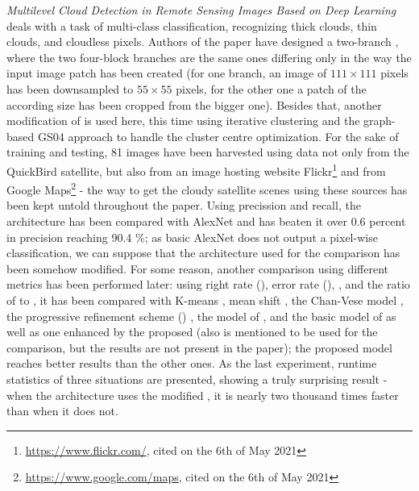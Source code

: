 \textit{Multilevel Cloud Detection in Remote Sensing Images Based on Deep Learning} deals with a task of multi-class classification, recognizing thick clouds, thin clouds, and cloudless pixels. Authors of the paper have designed a two-branch , where the two four-block branches are the same ones differing only in the way the input image patch has been created (for one branch, an image of $111 \times 111$ pixels has been downsampled to $55 \times 55$ pixels, for the other one a patch of the according size has been cropped from the bigger one). Besides that, another modification of  \cite{slic} is used here, this time using iterative clustering and the graph-based GS04 approach \cite{gs04} to handle the cluster centre optimization. For the sake of training and testing, 81  images have been harvested using data not only from the QuickBird satellite, but also from an image hosting website Flickr\footnote{\url{https://www.flickr.com/}, cited on the 6th of May 2021} and from Google Maps\footnote{\url{https://www.google.com/maps}, cited on the 6th of May 2021} - the way to get the cloudy satellite scenes using these sources has been kept untold throughout the paper. Using precission and recall, the architecture has been compared with AlexNet\cite{cnn-classification} and has beaten it over 0.6 percent in precision reaching 90.4 \%; as basic AlexNet does not output a pixel-wise classification, we can suppose that the architecture used for the comparison has been somehow modified. For some reason, another comparison using different metrics has been performed later: using right rate (), error rate (), , and the ratio of  to , it has been compared with K-means \cite{k-means}, mean shift \cite{mean-shift}, the Chan-Vese model \cite{chan-vese}, the progressive refinement scheme () \cite{cloud-detection-progressive-refinement}, the model of \cite{cloud-detection-scene-learning}, and the basic model of \cite{saliency-detection-dl} as well as one enhanced by the proposed  (also \cite{multiphase-mumford-shah} is mentioned to be used for the comparison, but the results are not present in the paper); the proposed model reaches better results than the other ones. As the last experiment, runtime statistics of three situations are presented, showing a truly surprising result - when the architecture uses the modified , it is nearly two thousand times faster than when it does not.

